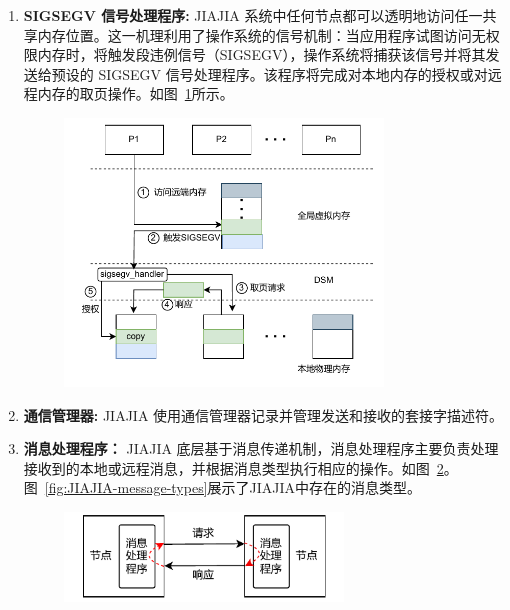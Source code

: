 {\begin{enumerate}[label=\arabic*.]
        \item \textbf{SIGSEGV 信号处理程序:} JIAJIA 系统中任何节点都可以透明地访问任一共享内存位置。这一机理利用了操作系统的信号机制：当应用程序试图访问无权限内存时，将触发段违例信号（SIGSEGV），操作系统将捕获该信号并将其发送给预设的 SIGSEGV 信号处理程序。该程序将完成对本地内存的授权或对远程内存的取页操作。如图~\ref{fig:JIAJIA-access}所示。
              \begin{figure}[!htbp]
                  \centering
                  \includegraphics[width=0.8\textwidth]{Img/JIAJIA访问远端内存.drawio.pdf}
                  \label{fig:JIAJIA-access}
              \end{figure}

        \item \textbf{通信管理器:} JIAJIA 使用通信管理器记录并管理发送和接收的套接字描述符。

        \item \textbf{消息处理程序：} JIAJIA 底层基于消息传递机制，消息处理程序主要负责处理接收到的本地或远程消息，并根据消息类型执行相应的操作。如图~\ref{fig:JIAJIA-message-handle}。图~\ref{fig:JIAJIA-message-types}展示了JIAJIA中存在的消息类型。
              \begin{figure}[!htbp]
                  \centering
                  \includegraphics[width=0.7\textwidth]{Img/JIAJIA底层消息传递机制.drawio.pdf}
                  \label{fig:JIAJIA-message-handle}
              \end{figure}


\end{enumerate}}
